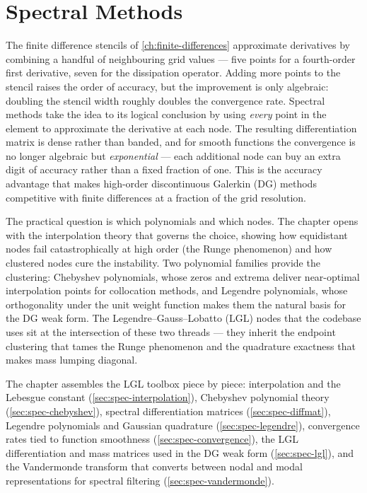 \chapter{Spectral Methods}
\label{ch:spectral-methods}

The finite difference stencils of \cref{ch:finite-differences} approximate
derivatives by combining a handful of neighbouring grid values --- five points
for a fourth-order first derivative, seven for the dissipation operator.
Adding more points to the stencil raises the order of accuracy, but the
improvement is only algebraic: doubling the stencil width roughly doubles the
convergence rate.  Spectral methods take the idea to its logical conclusion
by using \emph{every} point in the element to approximate the derivative at
each node.  The resulting differentiation matrix is dense rather than banded,
and for smooth functions the convergence is no longer algebraic but
\emph{exponential} --- each additional node can buy an extra digit of
accuracy rather than a fixed fraction of one.  This is the accuracy advantage
that makes high-order discontinuous Galerkin (DG) methods competitive with
finite differences at a fraction of the grid resolution.

The practical question is which polynomials and which nodes.  The chapter
opens with the interpolation theory that governs the choice, showing how
equidistant nodes fail catastrophically at high order (the Runge phenomenon)
and how clustered nodes cure the instability.  Two polynomial families
provide the clustering: Chebyshev polynomials, whose zeros and extrema
deliver near-optimal interpolation points for collocation methods, and
Legendre polynomials, whose orthogonality under the unit weight function
makes them the natural basis for the DG weak form.  The Legendre--Gauss--Lobatto
(LGL) nodes that the codebase uses sit at the intersection of these two
threads --- they inherit the endpoint clustering that tames the Runge
phenomenon and the quadrature exactness that makes mass lumping diagonal.

The chapter assembles the LGL toolbox piece by piece: interpolation and
the Lebesgue constant (\cref{sec:spec-interpolation}), Chebyshev polynomial
theory (\cref{sec:spec-chebyshev}), spectral differentiation matrices
(\cref{sec:spec-diffmat}), Legendre polynomials and Gaussian quadrature
(\cref{sec:spec-legendre}), convergence rates tied to function smoothness
(\cref{sec:spec-convergence}), the LGL differentiation and mass matrices
used in the DG weak form (\cref{sec:spec-lgl}), and the Vandermonde
transform that converts between nodal and modal representations for spectral
filtering (\cref{sec:spec-vandermonde}).

